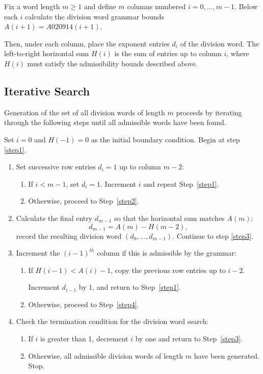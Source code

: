 \documentclass[12pt, oneside]{article}   	%
\numberwithin{equation}{section}          %
\theoremstyle{definition}
\begin{document}
Fix a word length $m \ge 1$ and define $m$ columns numbered $i=0,\dots,m-1$.
Below each $i$ calculate the division word grammar bounds $A(i+1)=A020914(i+1)$.

Then, under each column, place the exponent entries $d_i$ of the division word.
The left-to-right horizontal sum $H(i)$ is the sum of entries up to column $i$,
where $H(i)$ must satisfy the admissibility bounds described above.


\subsection*{Iterative Search}
Generation of the set of all division words of length $m$ proceeds by iterating
through the following steps until all admissible words have been found.

Set $i=0$ and $H(-1)=0$ as the initial boundary condition.  Begin at step \ref{step1}.

\begin{enumerate}

\item Set successive row entries $d_i=1$ up to column $m-2$:
\label{step1}
\begin{enumerate}
  \item If $i<m-1$, set $d_i=1$.
  Increment $i$ and repeat Step~\ref{step1}.
  \item Otherwise, proceed to Step~\ref{step2}.
\end{enumerate}

\item Calculate the final entry $d_{m-1}$ so that the horizontal sum matches $A(m)$:
\label{step2}
\[
d_{m-1} = A(m) - H(m-2),
\]
record the resulting division word $(d_0,\dots,d_{m-1})$. Continue to step \ref{step3}.

\item Increment the $(i-1)^{th}$ column if this is admissible by the grammar:
\label{step3}
\begin{enumerate}
  \item If $H(i-1) < A(i) - 1$, copy the previous row entries up to $i-2$.

  Increment $d_{i-1}$ by 1, and return to Step~\ref{step1}.
  \item Otherwise, proceed to Step~\ref{step4}.
\end{enumerate}

\item Check the termination condition for the division word search:
\label{step4}

\begin{enumerate}
  \item If $i$ is greater than 1, decrement $i$ by one and return to Step~\ref{step3}.
  \item Otherwise, all admissible division words of length $m$ have been generated.  Stop.
\end{enumerate}

\end{enumerate}
\end{document}
